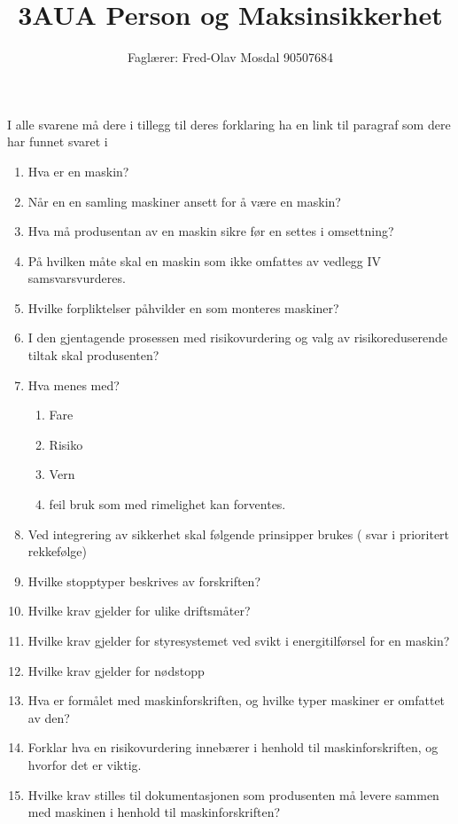\documentclass[12pt,a4paper]{article}
\def\oppgave{
		}
\begin{document}
\title{3AUA Person og Maksinsikkerhet}
\author{Faglærer: Fred-Olav Mosdal 90507684\\}
\maketitle
\oppgave{}%
\vskip 2.5pt 
I alle svarene må dere i tillegg til deres forklaring ha en link til
paragraf som dere har funnet svaret i
\begin{enumerate}
\item Hva er en maskin?
	\vskip 5pt
\item Når en en samling maskiner ansett for å være en maskin?
\item Hva må produsentan av en maskin sikre før en settes i omsettning?
\item På hvilken måte skal en maskin som ikke omfattes av vedlegg IV samsvarsvurderes. 
\item Hvilke forpliktelser påhvilder en som monteres maskiner?
\item I den gjentagende prosessen med risikovurdering og valg av risikoreduserende
tiltak skal produsenten?
\item Hva menes med?
\begin{enumerate}
\item Fare
\item Risiko
\item Vern
\item feil bruk som med rimelighet kan forventes. 
\end{enumerate}
\item Ved integrering av sikkerhet skal følgende prinsipper brukes ( svar
i prioritert rekkefølge)
\item Hvilke stopptyper beskrives av forskriften?
\item Hvilke krav gjelder for ulike driftsmåter?
\item Hvilke krav gjelder for styresystemet ved svikt i energitilførsel
for en maskin?
\item Hvilke krav gjelder for nødstopp
\item Hva er formålet med maskinforskriften, og hvilke typer maskiner er omfattet av den?
\item Forklar hva en risikovurdering innebærer i henhold til maskinforskriften, og hvorfor det er viktig.
\item Hvilke krav stilles til dokumentasjonen som produsenten må levere sammen med maskinen i henhold til maskinforskriften?

\end{enumerate}
\end{document}
